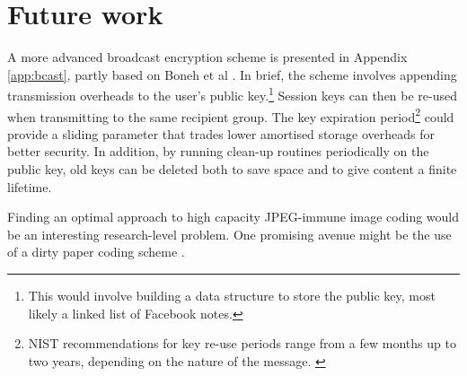 \section{Future work}
\label{sec:future}

A more advanced broadcast encryption scheme is presented in Appendix \ref{app:bcast}, partly based on Boneh et al \cite{boneh}. In brief, the scheme involves appending transmission overheads to the user's public key.\footnote{This would involve building a data structure to store the public key, most likely a linked list of Facebook notes.} Session keys can then be re-used when transmitting to the same recipient group. The key expiration period\footnote{NIST recommendations for key re-use periods range from a few months up to two years, depending on the nature of the message. \cite{nist-key}} could provide a sliding parameter that trades lower amortised storage overheads for better security. In addition, by running clean-up routines periodically on the public key, old keys can be deleted both to save space and to give content a finite lifetime.

Finding an optimal approach to high capacity JPEG-immune image coding would be an interesting research-level problem. One promising avenue might be the use of a dirty paper coding scheme \cite{dpaper}.







